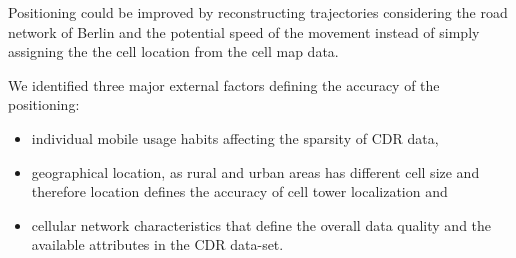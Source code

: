 Positioning could be improved by reconstructing trajectories considering the road network of Berlin and the potential speed of the movement instead of simply assigning the the cell location from the cell map data.

We identified three major external factors defining the accuracy of the positioning:
\begin{itemize}
    \item individual mobile usage habits affecting the sparsity of CDR data,
    \item geographical location, as rural and urban areas has different cell size and therefore location defines the accuracy of cell tower localization and
    \item cellular network characteristics that define the overall data quality and the available attributes in the CDR data-set.
\end{itemize}
